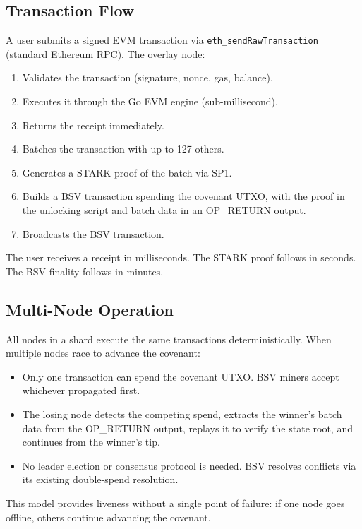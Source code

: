 \documentclass[11pt,twocolumn]{article}
\begin{document}
\subsection{Transaction Flow}

A user submits a signed EVM transaction via \texttt{eth\_sendRawTransaction} (standard Ethereum RPC). The overlay node:

\begin{enumerate}[nosep,leftmargin=1.5em]
\item Validates the transaction (signature, nonce, gas, balance).
\item Executes it through the Go EVM engine (sub-millisecond).
\item Returns the receipt immediately.
\item Batches the transaction with up to 127 others.
\item Generates a STARK proof of the batch via SP1.
\item Builds a BSV transaction spending the covenant UTXO, with the proof in the unlocking script and batch data in an OP\_RETURN output.
\item Broadcasts the BSV transaction.
\end{enumerate}

The user receives a receipt in milliseconds. The STARK proof follows in seconds. The BSV finality follows in minutes.

\subsection{Multi-Node Operation}

All nodes in a shard execute the same transactions deterministically. When multiple nodes race to advance the covenant:

\begin{itemize}[nosep,leftmargin=1.5em]
\item Only one transaction can spend the covenant UTXO. BSV miners accept whichever propagated first.
\item The losing node detects the competing spend, extracts the winner's batch data from the OP\_RETURN output, replays it to verify the state root, and continues from the winner's tip.
\item No leader election or consensus protocol is needed. BSV resolves conflicts via its existing double-spend resolution.
\end{itemize}

This model provides liveness without a single point of failure: if one node goes offline, others continue advancing the covenant.
\end{document}
